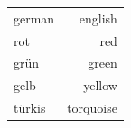 \documentclass{article}
\begin{document}
\begin{center}
  \begin{tabular}{lr}
    german  & english \\
    rot     & red \\
    grün   & green \\
    gelb    & yellow \\
    türkis & torquoise \\
  \end{tabular}
\end{center}
\end{document}
